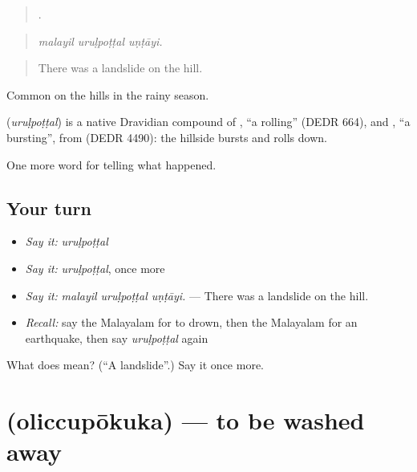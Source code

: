 \begin{quote}
  .
\end{quote}

\begin{quote}
\emph{malayil uruḷpoṭṭal uṇṭāyi.}
\end{quote}

\begin{quote}
There was a landslide on the hill.
\end{quote}

Common on the hills in the rainy season.

\begin{cousinweb}
\textbf{} (\emph{uruḷpoṭṭal}) is a native Dravidian compound of , \textquotedblleft{}a rolling\textquotedblright{} (DEDR 664), and , \textquotedblleft{}a bursting\textquotedblright{}, from  (DEDR 4490): the hillside bursts and rolls down.
\end{cousinweb}

\begin{grammarlens}[title={What you've built}]
One more word for telling what happened.
\end{grammarlens}

\subsection*{Your turn}
\begin{itemize}
\raggedright
  \item \emph{Say it:} \emph{uruḷpoṭṭal}
  \item \emph{Say it:} \emph{uruḷpoṭṭal}, once more
  \item \emph{Say it:} \emph{malayil uruḷpoṭṭal uṇṭāyi.} — There was a landslide on the hill.
  \item \emph{Recall:} say the Malayalam for to drown, then the Malayalam for an earthquake, then say \emph{uruḷpoṭṭal} again
\end{itemize}

\begin{tcolorbox}[breakable,colback=teal!4,colframe=teal!35!black,title={Before you move on}]
What does  mean? (\textquotedblleft{}A landslide\textquotedblright{}.) Say it once more.
\end{tcolorbox}
\section[\texorpdfstring{\ml{ഒലിച്ചുപോകുക} (oliccupōkuka)}{ഒലിച്ചുപോകുക (oliccupōkuka)}]{ (oliccupōkuka) — to be washed away}

